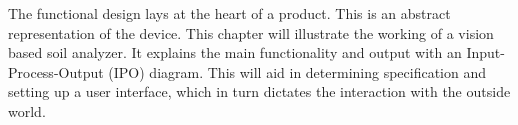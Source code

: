 The functional design lays at the heart of a product. This is an abstract representation of the device. This chapter will illustrate the working of a vision based soil analyzer. It explains the main functionality and output with an Input-Process-Output (IPO) diagram. This will aid in determining specification and setting up a user interface, which in turn dictates the interaction with the outside world.